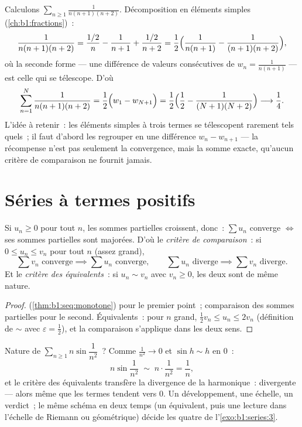 \begin{example}\label{ex:b1:series:telescope3}
Calculons $\sum_{n\geq1} \frac{1}{n(n+1)(n+2)}$. Décomposition en
éléments simples (\cref{ch:b1:fractions})~:
\[
\frac{1}{n(n+1)(n+2)}
= \frac{1/2}{n} - \frac{1}{n+1} + \frac{1/2}{n+2}
= \frac12\Bigl(\frac{1}{n(n+1)} - \frac{1}{(n+1)(n+2)}\Bigr),
\]
où la seconde forme --- une différence de valeurs consécutives de
$w_n = \frac{1}{n(n+1)}$ --- est celle qui se télescope. D'où
\[
\sum_{n=1}^{N} \frac{1}{n(n+1)(n+2)}
= \frac12\Bigl(w_1 - w_{N+1}\Bigr)
= \frac12\Bigl(\frac12 - \frac{1}{(N+1)(N+2)}\Bigr)
\longrightarrow \frac14 .
\]
L'idée à retenir~: les éléments simples à trois termes se
télescopent rarement tels quels~; il faut d'abord les regrouper en
une différence $w_n - w_{n+1}$ --- la récompense n'est pas seulement
la convergence, mais la somme exacte, qu'aucun critère de
comparaison ne fournit jamais.
\end{example}

\section{Séries à termes positifs}

\begin{theorem}\label{thm:b1:series:positive}
Si $u_n \geq 0$ pour tout $n$, les sommes partielles croissent, donc~:
$\sum u_n$ converge $\iff$ ses sommes partielles sont majorées. D'où
le \emph{critère de comparaison}~: si $0 \leq u_n \leq v_n$ pour tout
$n$ (assez grand),
\[
\sum v_n \text{ converge} \implies \sum u_n \text{ converge},
\qquad
\sum u_n \text{ diverge} \implies \sum v_n \text{ diverge}.
\]
Et le \emph{critère des équivalents}~: si $u_n \sim v_n$ avec $v_n \geq
0$, les deux  sont de même nature.
\end{theorem}

\begin{proof}
 (\cref{thm:b1:seq:monotone}) pour le
premier point~; comparaison des sommes partielles pour le second.
Équivalents~: pour $n$ grand, $\frac12 v_n \leq u_n \leq 2 v_n$
(définition de $\sim$ avec $\varepsilon = \frac12$), et la comparaison
s'applique dans les deux sens.
\end{proof}

\begin{example}\label{ex:b1:series:equivdiverge}
Nature de $\sum_{n\geq1} n\sin\dfrac{1}{n^2}$~? Comme
$\frac{1}{n^2} \to 0$ et $\sin h \sim h$ en $0$~:
\[
n\sin\frac{1}{n^2} \;\sim\; n\cdot\frac{1}{n^2} = \frac1n ,
\]
et le critère des équivalents transfère la divergence de la 
harmonique~: divergente --- alors même que les termes tendent vers
$0$. Un développement, une échelle, un verdict~; le même schéma en
deux temps (un équivalent, puis une lecture dans l'échelle de
Riemann ou géométrique) décide les quatre  de
l'\cref{exo:b1:series:3}.
\end{example}

